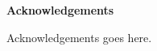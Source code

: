 \thispagestyle{plain}


\begin{center}
    
    {\Large \textbf{Acknowledgements}}
    
\end{center}

Acknowledgements goes here.

\newpage
